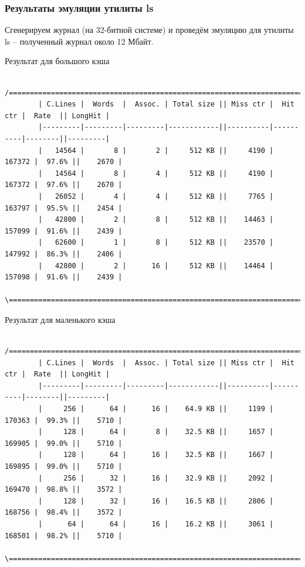 \documentclass{beamer}
\begin{document}

\begin{frame}[fragile] %
\frametitle{Результаты эмуляции утилиты ls}

Сгенерируем журнал (на 32-битной системе) и проведём эмуляцию для утилиты ls -- полученный журнал около 12 Мбайт.

\begin{block}{Результат для большого кэша}
\begin{verbatim}
        /=====================================================================================\
        | C.Lines |  Words  |  Assoc. | Total size || Miss ctr |  Hit ctr |  Rate  || LongHit |
        |---------|---------|---------|------------||----------|----------|--------||---------|
        |   14564 |       8 |       2 |     512 KB ||     4190 |   167372 |  97.6% ||    2670 |
        |   14564 |       8 |       4 |     512 KB ||     4190 |   167372 |  97.6% ||    2670 |
        |   26052 |       4 |       4 |     512 KB ||     7765 |   163797 |  95.5% ||    2454 |
        |   42800 |       2 |       8 |     512 KB ||    14463 |   157099 |  91.6% ||    2439 |
        |   62600 |       1 |       8 |     512 KB ||    23570 |   147992 |  86.3% ||    2406 |
        |   42800 |       2 |      16 |     512 KB ||    14464 |   157098 |  91.6% ||    2439 |
        \=====================================================================================/
\end{verbatim}
\end{block}

\begin{block}{Результат для маленького кэша}
\begin{verbatim}
        /=====================================================================================\
        | C.Lines |  Words  |  Assoc. | Total size || Miss ctr |  Hit ctr |  Rate  || LongHit |
        |---------|---------|---------|------------||----------|----------|--------||---------|
        |     256 |      64 |      16 |    64.9 KB ||     1199 |   170363 |  99.3% ||    5710 |
        |     128 |      64 |       8 |    32.5 KB ||     1657 |   169905 |  99.0% ||    5710 |
        |     128 |      64 |      16 |    32.5 KB ||     1667 |   169895 |  99.0% ||    5710 |
        |     256 |      32 |      16 |    32.9 KB ||     2092 |   169470 |  98.8% ||    3572 |
        |     128 |      32 |      16 |    16.5 KB ||     2806 |   168756 |  98.4% ||    3572 |
        |      64 |      64 |      16 |    16.2 KB ||     3061 |   168501 |  98.2% ||    5710 |
        \=====================================================================================/
\end{verbatim}
\end{block}

\end{frame}
\end{document}
